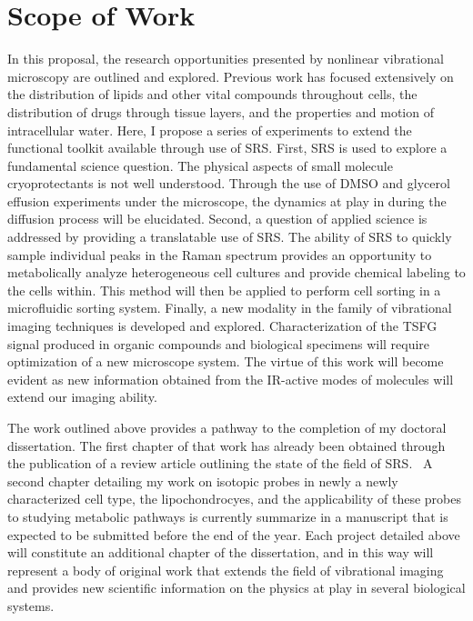 \section{Scope of Work}
In this proposal, the research opportunities presented by nonlinear vibrational microscopy are outlined and explored.  Previous work has focused extensively on the distribution of lipids and other vital compounds throughout cells, the distribution of drugs through tissue layers, and the properties and motion of intracellular water.  Here, I propose a series of experiments to extend the functional toolkit available through use of SRS.  First, SRS is used to explore a fundamental science question.  The physical aspects of small molecule cryoprotectants is not well understood.  Through the use of DMSO and glycerol effusion experiments under the microscope, the dynamics at play in during the diffusion process will be elucidated. Second, a question of applied science is addressed by providing a translatable use of SRS.  The ability of SRS to quickly sample individual peaks in the Raman spectrum provides an opportunity to metabolically analyze heterogeneous cell cultures and provide chemical labeling to the cells within.  This method will then be applied to perform cell sorting in a microfluidic sorting system.  Finally, a new modality in the family of vibrational imaging techniques is developed and explored.  Characterization of the TSFG signal produced in organic compounds and biological specimens will require optimization of a new microscope system.  The virtue of this work will become evident as new information obtained from the IR-active modes of molecules will extend our imaging ability.

The work outlined above provides a pathway to the completion of my doctoral dissertation.  The first chapter of that work has already been obtained through the publication of a review article outlining the state of the field of SRS.~\cite{Prince:2017aa} A second chapter detailing my work on isotopic probes in newly a newly characterized cell type, the lipochondrocyes, and the applicability of these probes to studying metabolic pathways is currently summarize in a manuscript that is expected to be submitted before the end of the year.  Each project detailed above will constitute an additional chapter of the dissertation, and in this way will represent a body of original work that extends the field of vibrational imaging and provides new scientific information on the physics at play in several biological systems.

